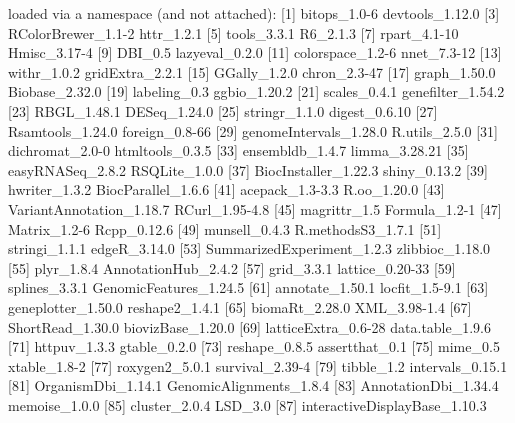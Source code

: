 \documentclass{article}
\begin{document}
\begin{Schunk}
\begin{Soutput}
loaded via a namespace (and not attached):
 [1] bitops_1.0-6                  devtools_1.12.0              
 [3] RColorBrewer_1.1-2            httr_1.2.1                   
 [5] tools_3.3.1                   R6_2.1.3                     
 [7] rpart_4.1-10                  Hmisc_3.17-4                 
 [9] DBI_0.5                       lazyeval_0.2.0               
[11] colorspace_1.2-6              nnet_7.3-12                  
[13] withr_1.0.2                   gridExtra_2.2.1              
[15] GGally_1.2.0                  chron_2.3-47                 
[17] graph_1.50.0                  Biobase_2.32.0               
[19] labeling_0.3                  ggbio_1.20.2                 
[21] scales_0.4.1                  genefilter_1.54.2            
[23] RBGL_1.48.1                   DESeq_1.24.0                 
[25] stringr_1.1.0                 digest_0.6.10                
[27] Rsamtools_1.24.0              foreign_0.8-66               
[29] genomeIntervals_1.28.0        R.utils_2.5.0                
[31] dichromat_2.0-0               htmltools_0.3.5              
[33] ensembldb_1.4.7               limma_3.28.21                
[35] easyRNASeq_2.8.2              RSQLite_1.0.0                
[37] BiocInstaller_1.22.3          shiny_0.13.2                 
[39] hwriter_1.3.2                 BiocParallel_1.6.6           
[41] acepack_1.3-3.3               R.oo_1.20.0                  
[43] VariantAnnotation_1.18.7      RCurl_1.95-4.8               
[45] magrittr_1.5                  Formula_1.2-1                
[47] Matrix_1.2-6                  Rcpp_0.12.6                  
[49] munsell_0.4.3                 R.methodsS3_1.7.1            
[51] stringi_1.1.1                 edgeR_3.14.0                 
[53] SummarizedExperiment_1.2.3    zlibbioc_1.18.0              
[55] plyr_1.8.4                    AnnotationHub_2.4.2          
[57] grid_3.3.1                    lattice_0.20-33              
[59] splines_3.3.1                 GenomicFeatures_1.24.5       
[61] annotate_1.50.1               locfit_1.5-9.1               
[63] geneplotter_1.50.0            reshape2_1.4.1               
[65] biomaRt_2.28.0                XML_3.98-1.4                 
[67] ShortRead_1.30.0              biovizBase_1.20.0            
[69] latticeExtra_0.6-28           data.table_1.9.6             
[71] httpuv_1.3.3                  gtable_0.2.0                 
[73] reshape_0.8.5                 assertthat_0.1               
[75] mime_0.5                      xtable_1.8-2                 
[77] roxygen2_5.0.1                survival_2.39-4              
[79] tibble_1.2                    intervals_0.15.1             
[81] OrganismDbi_1.14.1            GenomicAlignments_1.8.4      
[83] AnnotationDbi_1.34.4          memoise_1.0.0                
[85] cluster_2.0.4                 LSD_3.0                      
[87] interactiveDisplayBase_1.10.3
\end{Soutput}
\end{Schunk}
\end{document}
